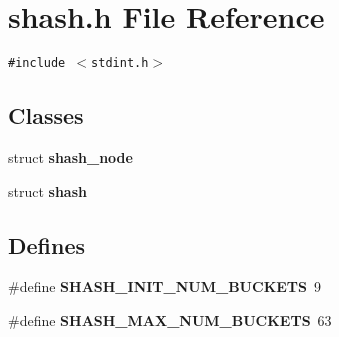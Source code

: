 \section{shash.h File Reference}
\label{shash_8h}
{\tt \#include $<$stdint.h$>$}\par
\subsection*{Classes}
\begin{CompactItemize}
\item 
struct {\bf shash\_\-node}
\item 
struct {\bf shash}
\end{CompactItemize}
\subsection*{Defines}
\begin{CompactItemize}
\item 
\#define {\bf SHASH\_\-INIT\_\-NUM\_\-BUCKETS}\ 9\label{shash_8h_a0}

\item 
\#define {\bf SHASH\_\-MAX\_\-NUM\_\-BUCKETS}\ 63\label{shash_8h_a1}

\end{CompactItemize}
